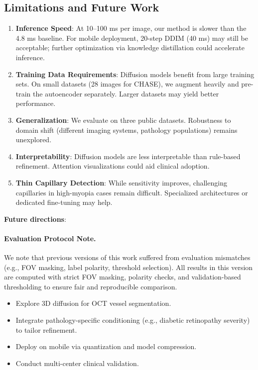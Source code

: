 \documentclass[11pt]{article}
\begin{document}
\subsection{Limitations and Future Work}

\begin{enumerate}
    \item \textbf{Inference Speed}: At 10--100 ms per image, our method is slower than the 4.8 ms baseline. For mobile deployment, 20-step DDIM (40 ms) may still be acceptable; further optimization via knowledge distillation could accelerate inference.
    
    \item \textbf{Training Data Requirements}: Diffusion models benefit from large training sets. On small datasets (28 images for CHASE), we augment heavily and pre-train the autoencoder separately. Larger datasets may yield better performance.
    
    \item \textbf{Generalization}: We evaluate on three public datasets. Robustness to domain shift (different imaging systems, pathology populations) remains unexplored.
    
    \item \textbf{Interpretability}: Diffusion models are less interpretable than rule-based refinement. Attention visualizations could aid clinical adoption.
    
    \item \textbf{Thin Capillary Detection}: While sensitivity improves, challenging capillaries in high-myopia cases remain difficult. Specialized architectures or dedicated fine-tuning may help.
\end{enumerate}

\textbf{Future directions}:

\paragraph{Evaluation Protocol Note.}
We note that previous versions of this work suffered from evaluation mismatches (e.g., FOV masking, label polarity, threshold selection). All results in this version are computed with strict FOV masking, polarity checks, and validation-based thresholding to ensure fair and reproducible comparison.
\begin{itemize}
    \item Explore 3D diffusion for OCT vessel segmentation.
    \item Integrate pathology-specific conditioning (e.g., diabetic retinopathy severity) to tailor refinement.
    \item Deploy on mobile via quantization and model compression.
    \item Conduct multi-center clinical validation.
\end{itemize}
\end{document}
